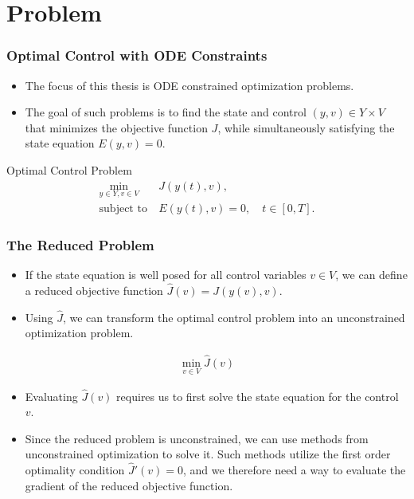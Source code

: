 \documentclass[9pt]{beamer}
\begin{document}
\section{Problem}
\begin{frame}
\frametitle{Optimal Control with ODE Constraints}
\begin{itemize}
\item{The focus of this thesis is ODE constrained optimization problems.}
\item{The goal of such problems is to find the state and control $(y,v)\in Y\times V$ that minimizes the objective function $J$, while simultaneously satisfying the state equation $E(y,v)=0$.}
\end{itemize}
\begin{block}{Optimal Control Problem}
\begin{align*}
\min_{y\in Y,v\in V} &J(y(t),v), \\
\textrm{subject to} \ &E(y(t),v)=0,\quad t\in[0,T].
\end{align*}
\end{block}
\end{frame}
\begin{frame}
\frametitle{The Reduced Problem}
\begin{itemize}
\item{If the state equation is well posed for all control variables $v\in V$, we can define a reduced objective function $\hat{J}(v) = J(y(v),v)$.}
\item{Using $\hat J$, we can transform the optimal control problem into an unconstrained optimization problem.}
\end{itemize}
\begin{align*}
\min_{v\in V}\hat J (v)
\end{align*}
\begin{itemize}
\item{Evaluating $\hat J(v)$ requires us to first solve the state equation for the control $v$.}
\item{Since the reduced problem is unconstrained, we can use methods from unconstrained optimization to solve it. Such methods utilize the first order optimality condition $\hat J'(v)=0$, and we therefore need a way to evaluate the gradient of the reduced objective function.}
\end{itemize}
\end{frame}
\end{document}
